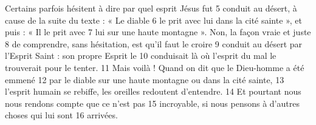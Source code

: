 Certains parfois hésitent à dire par quel esprit Jésus fut	 
5	 	conduit au désert, à cause de la suite du texte : « Le diable	 
6	 	le prit avec lui dans la cité sainte », et puis : « Il le prit avec	 
7	 	lui sur une haute montagne ». Non, la façon vraie et juste	 
8	 	de comprendre, sans hésitation, est qu'il faut le croire	 
9	 	conduit au désert par l'Esprit Saint : son propre Esprit le	 
10	 	conduisait là où l'esprit du mal le trouverait pour le tenter.	 
11	 	Mais voilà ! Quand on dit que le Dieu-homme a été emmené	 
12	 	par le diable sur une haute montagne ou dans la cité sainte,	 
13	 	l'esprit humain se rebiffe, les oreilles redoutent d'entendre.	 
14	 	Et pourtant nous nous rendons compte que ce n'est pas	 
15	 	incroyable, si nous pensons à d'autres choses qui lui sont	 
16	 	arrivées.